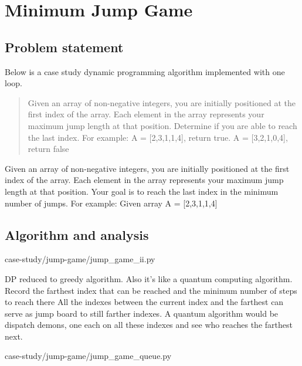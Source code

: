 \chapter{Minimum Jump Game}\label{ch:minimumjumpgame}
\section{Problem statement}\label{sec:problemStatement}

Below is a case study dynamic programming algorithm implemented with one loop.
\begin{quote}
    Given an array of non-negative integers, you are initially positioned at the first index of the array.
    Each element in the array represents your maximum jump length at that position.
    Determine if you are able to reach the last index.
    For example:
    A = [2,3,1,1,4], return true.
    A = [3,2,1,0,4], return false
\end{quote}



Given an array of non-negative integers, you are initially positioned at the first index of
the array.
Each element in the array represents your maximum jump length at that position.
Your goal is to reach the last index in the minimum number of jumps.
For example:
Given array A = [2,3,1,1,4]
\section{Algorithm and analysis}

\begin{clisting}
    
    {case-study/jump-game/jump_game_ii.py}
\end{clisting}

DP reduced to greedy algorithm.
Also it's like a quantum computing algorithm.
Record the farthest index that can be reached and the minimum number of steps to reach there
All the indexes between the current index and the farthest can serve as jump board to
still farther indexes.
A quantum algorithm would be dispatch demons, one each on all these indexes and see who
reaches the farthest next.

\begin{clisting}
    
    {case-study/jump-game/jump_game_queue.py}
\end{clisting}
